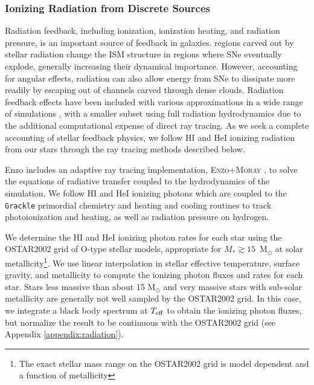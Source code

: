\documentclass[fleqn,usenatbib,useAMS]{mnras}
\begin{document}
\subsubsection{Ionizing Radiation from Discrete Sources}
\label{sec:ionizing radiation}
Radiation feedback, including ionization, ionization heating, and radiation pressure, is an important source of feedback in galaxies.  regions carved out by stellar radiation change the ISM structure in regions where SNe eventually explode, generally increasing their dynamical importance. However, accounting for angular effects, radiation can also allow energy from SNe to dissipate more readily by escaping out of channels carved through dense clouds. Radiation feedback effects have been included with various approximations in a wide range of simulations \citep[e.g.][]{OppenheimerDave2006, Krumholz2007, HopkinsQuataertMurray2012, Agertz2013, Renaud2013, Stinson2013, Roskar2014, Ceverino2014, FIRE, AgertzKravtsov2015, Forbes2016, Hu2016, Hu2017, FIRE2}, with a smaller subset using full radiation hydrodynamics \citep{WiseAbel2012,Wise2012a,Wise2014,Kim2013a, Kim2013b,Pawlik2013,Rosdahl2015,Aubert2015,Ocvirk2016,BaczynskiGloverKlessen2015,Pawlik2017} due to the additional computational expense of direct ray tracing. As we seek a complete accounting of stellar feedback physics, we follow HI and HeI ionizing radiation from our stars through the ray tracing methods described below. 

Enzo includes an adaptive ray tracing implementation, \textsc{Enzo+Moray} \citep{WiseAbel2011}, to solve the equations of radiative transfer coupled to the hydrodynamics of the simulation. We follow HI and HeI ionizing photons which are coupled to the \texttt{Grackle} primordial chemistry and heating and cooling routines to track photoionization and heating, as well as radiation pressure on hydrogen. 

We determine the HI and HeI ionizing photon rates for each star using the OSTAR2002 \citep{Lanz2003} grid of O-type stellar models, appropriate for $M_{*} \gtrsim 15$~M$_{\odot}$ at solar metallicity\footnote{The exact stellar mass range on the OSTAR2002 grid is model dependent and a function of metallicity}. We use linear interpolation in stellar effective temperature, surface gravity, and metallicity to compute the ionizing photon fluxes and rates for each star. Stars less massive than about 15 M$_{\odot}$ and very massive stars with sub-solar metallicity are generally not well sampled by the OSTAR2002 grid. In this case, we integrate a black body spectrum at $T_{\rm eff}$ to obtain the ionizing photon fluxes, but normalize the result to be continuous with the OSTAR2002 grid (see Appendix \ref{appendix:radiation}).
\end{document}
